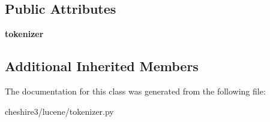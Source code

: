 \subsection*{Public Attributes}
\begin{DoxyCompactItemize}
\item 
\hypertarget{classcheshire3_1_1lucene_1_1tokenizer_1_1_lucene_tokenizer_a6ed2ecc9bf997682dcac341e6207b534}{{\bfseries tokenizer}}\label{classcheshire3_1_1lucene_1_1tokenizer_1_1_lucene_tokenizer_a6ed2ecc9bf997682dcac341e6207b534}

\end{DoxyCompactItemize}
\subsection*{Additional Inherited Members}


The documentation for this class was generated from the following file\-:\begin{DoxyCompactItemize}
\item 
cheshire3/lucene/tokenizer.\-py\end{DoxyCompactItemize}
